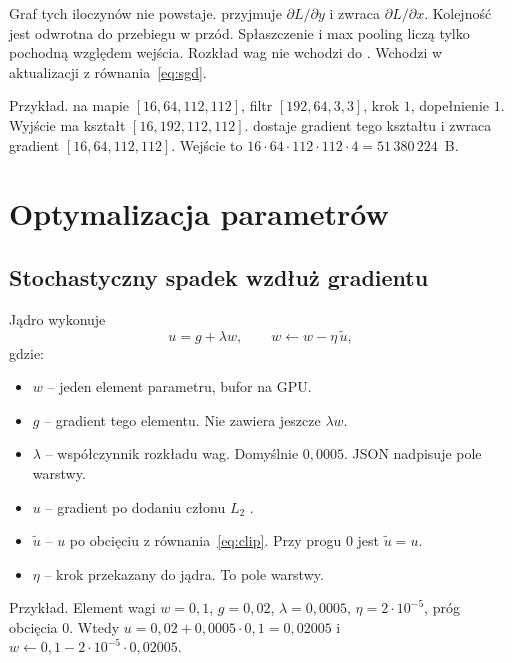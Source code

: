 Graf tych iloczynów nie powstaje.  przyjmuje \(\partial L / \partial y\) i zwraca \(\partial L / \partial x\). Kolejność jest odwrotna do przebiegu w przód. Spłaszczenie i max pooling liczą tylko pochodną względem wejścia. Rozkład wag nie wchodzi do . Wchodzi w aktualizacji z równania~\eqref{eq:sgd}.

Przykład.  na mapie \([16, 64, 112, 112]\), filtr \([192, 64, 3, 3]\), krok \(1\), dopełnienie \(1\). Wyjście ma kształt \([16, 192, 112, 112]\).  dostaje gradient tego kształtu i zwraca gradient \([16, 64, 112, 112]\). Wejście to \(16 \cdot 64 \cdot 112 \cdot 112 \cdot 4 = 51\,380\,224\)~B.

\section{Optymalizacja parametrów}

\subsection{Stochastyczny spadek wzdłuż gradientu}

Jądro  wykonuje
\begin{equation}
\label{eq:sgd}
u = g + \lambda w,
\qquad
w \leftarrow w - \eta\,\widetilde{u},
\end{equation}
gdzie:
\begin{itemize}
\item \(w\) -- jeden element parametru, bufor na GPU.
\item \(g\) -- gradient tego elementu. Nie zawiera jeszcze \(\lambda w\).
\item \(\lambda\) -- współczynnik rozkładu wag. Domyślnie \(0{,}0005\). JSON nadpisuje pole warstwy.
\item \(u\) -- gradient po dodaniu członu \(L_2\) \cite{goodfellow2016deep}.
\item \(\widetilde{u}\) -- \(u\) po obcięciu z równania~\eqref{eq:clip}. Przy progu \(0\) jest \(\widetilde{u} = u\).
\item \(\eta\) -- krok przekazany do jądra. To pole  warstwy.
\end{itemize}

Przykład. Element wagi \(w = 0{,}1\), \(g = 0{,}02\), \(\lambda = 0{,}0005\), \(\eta = 2 \cdot 10^{-5}\), próg obcięcia \(0\). Wtedy \(u = 0{,}02 + 0{,}0005 \cdot 0{,}1 = 0{,}02005\) i \(w \leftarrow 0{,}1 - 2 \cdot 10^{-5} \cdot 0{,}02005\).

